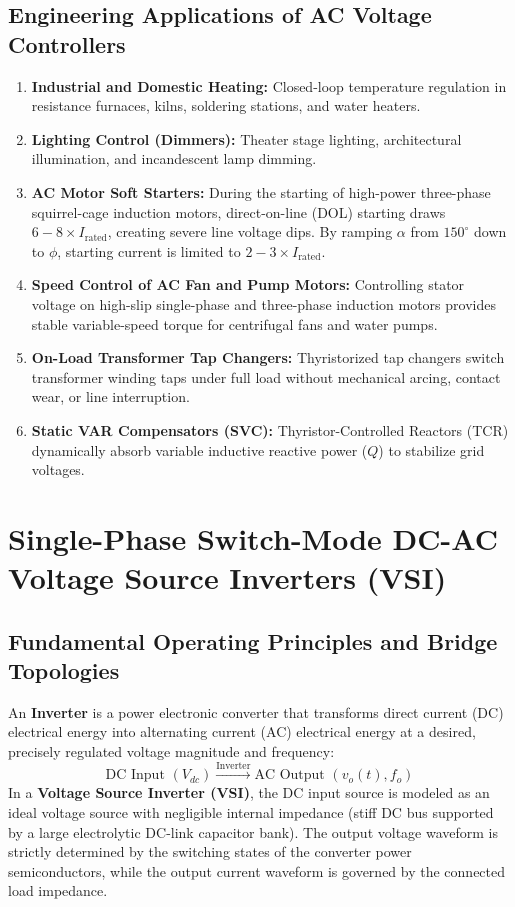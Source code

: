 \documentclass[11pt,a4paper]{article}
\let\origsection\section
\renewcommand{\section}{\Needspace{12\baselineskip}\origsection}
\let\origsubsection\subsection
\renewcommand{\subsection}{\Needspace{7\baselineskip}\origsubsection}
\begin{document}
\subsection{Engineering Applications of AC Voltage Controllers}
\begin{enumerate}[leftmargin=*]
  \item \textbf{Industrial and Domestic Heating:} Closed-loop temperature regulation in resistance furnaces, kilns, soldering stations, and water heaters.
  \item \textbf{Lighting Control (Dimmers):} Theater stage lighting, architectural illumination, and incandescent lamp dimming.
  \item \textbf{AC Motor Soft Starters:} During the starting of high-power three-phase squirrel-cage induction motors, direct-on-line (DOL) starting draws $6 - 8 \times I_{\text{rated}}$, creating severe line voltage dips. By ramping $\alpha$ from $150^\circ$ down to $\phi$, starting current is limited to $2 - 3 \times I_{\text{rated}}$.
  \item \textbf{Speed Control of AC Fan and Pump Motors:} Controlling stator voltage on high-slip single-phase and three-phase induction motors provides stable variable-speed torque for centrifugal fans and water pumps.
  \item \textbf{On-Load Transformer Tap Changers:} Thyristorized tap changers switch transformer winding taps under full load without mechanical arcing, contact wear, or line interruption.
  \item \textbf{Static VAR Compensators (SVC):} Thyristor-Controlled Reactors (TCR) dynamically absorb variable inductive reactive power ($Q$) to stabilize grid voltages.
\end{enumerate}


\section{Single-Phase Switch-Mode DC-AC Voltage Source Inverters (VSI)}

\subsection{Fundamental Operating Principles and Bridge Topologies}

An \textbf{Inverter} is a power electronic converter that transforms direct current (DC) electrical energy into alternating current (AC) electrical energy at a desired, precisely regulated voltage magnitude and frequency:
\begin{equation}
\text{DC Input } (V_{dc}) \xrightarrow{\text{Inverter}} \text{AC Output } (v_o(t), f_o)
\end{equation}
In a \textbf{Voltage Source Inverter (VSI)}, the DC input source is modeled as an ideal voltage source with negligible internal impedance (stiff DC bus supported by a large electrolytic DC-link capacitor bank). The output voltage waveform is strictly determined by the switching states of the converter power semiconductors, while the output current waveform is governed by the connected load impedance.
\end{document}
